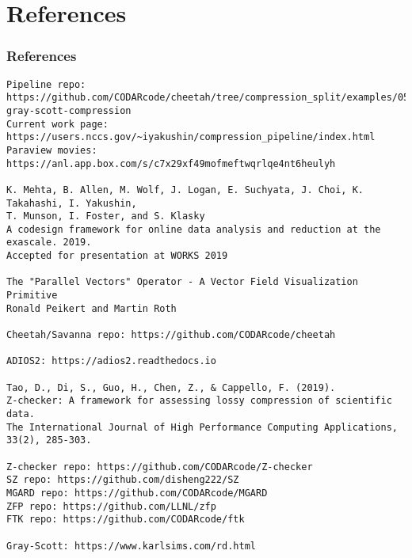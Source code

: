 \section{References}                                                                                                                                                                 
\begin{frame}[fragile]                                                                                                                                                               
  \frametitle{References}                                                                                                                                                            
{\tiny                                                                                                                                                                               
\begin{verbatim}
Pipeline repo:
https://github.com/CODARcode/cheetah/tree/compression_split/examples/05-gray-scott-compression
Current work page:
https://users.nccs.gov/~iyakushin/compression_pipeline/index.html
Paraview movies:
https://anl.app.box.com/s/c7x29xf49mofmeftwqrlqe4nt6heulyh

K. Mehta, B. Allen, M. Wolf, J. Logan, E. Suchyata, J. Choi, K. Takahashi, I. Yakushin, 
T. Munson, I. Foster, and S. Klasky
A codesign framework for online data analysis and reduction at the exascale. 2019. 
Accepted for presentation at WORKS 2019

The "Parallel Vectors" Operator - A Vector Field Visualization Primitive
Ronald Peikert and Martin Roth

Cheetah/Savanna repo: https://github.com/CODARcode/cheetah

ADIOS2: https://adios2.readthedocs.io

Tao, D., Di, S., Guo, H., Chen, Z., & Cappello, F. (2019). 
Z-checker: A framework for assessing lossy compression of scientific data. 
The International Journal of High Performance Computing Applications, 33(2), 285-303.

Z-checker repo: https://github.com/CODARcode/Z-checker
SZ repo: https://github.com/disheng222/SZ
MGARD repo: https://github.com/CODARcode/MGARD
ZFP repo: https://github.com/LLNL/zfp
FTK repo: https://github.com/CODARcode/ftk

Gray-Scott: https://www.karlsims.com/rd.html
\end{verbatim}
}

\end{frame}
